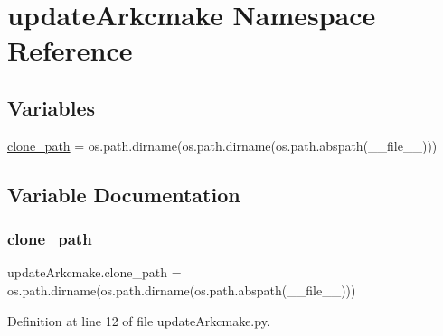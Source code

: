 \hypertarget{namespaceupdateArkcmake}{}\section{update\+Arkcmake Namespace Reference}
\label{namespaceupdateArkcmake}
\subsection*{Variables}
\begin{DoxyCompactItemize}
\item 
\mbox{\hyperlink{namespaceupdateArkcmake_ac34cf8dbf96082ee0a50f76fb2cf9d33}{clone\+\_\+path}} = os.\+path.\+dirname(os.\+path.\+dirname(os.\+path.\+abspath(\+\_\+\+\_\+file\+\_\+\+\_\+)))
\end{DoxyCompactItemize}


\subsection{Variable Documentation}
\mbox{\label{namespaceupdateArkcmake_ac34cf8dbf96082ee0a50f76fb2cf9d33}} 
\subsubsection{\texorpdfstring{clone\_path}{clone\_path}}
{\footnotesize\ttfamily update\+Arkcmake.\+clone\+\_\+path = os.\+path.\+dirname(os.\+path.\+dirname(os.\+path.\+abspath(\+\_\+\+\_\+file\+\_\+\+\_\+)))}



Definition at line 12 of file update\+Arkcmake.\+py.

